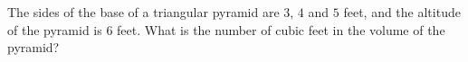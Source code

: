 The sides of the base of a triangular pyramid are $3$, $4$ and $5$ feet, and the altitude of the pyramid is $6$ feet. What is the number of cubic feet in the volume of the pyramid?
